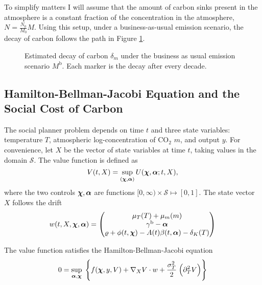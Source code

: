 \documentclass[../../main.tex]{subfiles}
\begin{document}
To simplify matters I will assume that the amount of carbon sinks present in the atmosphere is a constant fraction of the concentration in the atmosphere, $N = \frac{N_0}{M_0} M$. Using this setup, under a business-as-usual emission scenario, the decay of carbon follows the path in Figure \ref{fig:decaypath}.

\begin{figure}[H]
    \centering
    \caption{Estimated decay of carbon $\delta_m$ under the business as usual emission scenario $M^{\mathrm{b}}$. Each marker is the decay after every decade.}
    \label{fig:decaypath}
\end{figure}

\subsection{Hamilton-Bellman-Jacobi Equation and the Social Cost of Carbon}

The social planner problem depends on time $t$ and three state variables: temperature $T$, atmospheric log-concentration of CO$_2$ $m$, and output $y$. For convenience, let $X$ be the vector of state variables at time $t$, taking values in the domain $\mathcal{S}$. The value function is defined as \begin{equation}
    V(t, X) = \sup_{(\bm{\chi}, \bm{\alpha})} U(\bm{\chi}, \bm{\alpha}; t, X),
\end{equation} where the two controls $\bm{\chi}, \bm{\alpha}$ are functions $[0, \infty) \times \mathcal{S} \mapsto [0, 1]$. The state vector $X$ follows the drift \begin{equation}
    w(t, X,  \bm{\chi}, \bm{\alpha}) = \begin{pmatrix}
        \mu_T(T) + \mu_m(m) \\
        \gamma^{\mathrm{b}} - \bm{\alpha} \\
        \varrho + \phi(t, \bm{\chi}) - A(t) \beta(t, \bm{\alpha}) - \delta_K(T)
    \end{pmatrix}
\end{equation}

\begin{proposition}
    The value function satisfies the Hamilton-Bellman-Jacobi equation \begin{equation}
        0 = \sup_{\bm{\alpha}, \bm{\chi}} \; \Bigg\{ f(\bm{\chi}, y, V ) + \nabla_X V \cdot w + \frac{\sigma_T^2}{2} \; \Big(\partial^2_T V \Big) \Bigg\}
    \end{equation}
\end{proposition}
\end{document}
